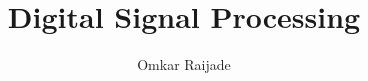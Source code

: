 \documentclass[journal,12pt,twocolumn]{IEEEtran}
\begin{document}
	\makeatother
	\let\StandardTheFigure\thefigure
	\renewcommand{\thefigure}{\theproblem}
	\def\putbox#1#2#3{\makebox[0in][l]{\makebox[#1][l]{}\raisebox{\baselineskip}[0in][0in]{\raisebox{#2}[0in][0in]{#3}}}}
	\def\rightbox#1{\makebox[0in][r]{#1}}
	\def\centbox#1{\makebox[0in]{#1}}
	\def\topbox#1{\raisebox{-\baselineskip}[0in][0in]{#1}}
	\def\midbox#1{\raisebox{-0.5\baselineskip}[0in][0in]{#1}}
	\vspace{3cm}
	\title{ 
			Digital Signal Processing
	}
	\author{ Omkar Raijade %
}
% 
%
\end{document}
